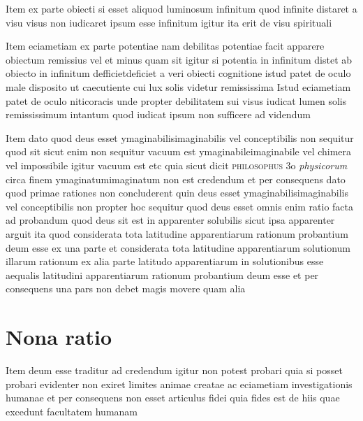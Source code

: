 \documentclass[twoside, openright]{report}
\newcommand{\name}[1]{\textsc{#1}}
\newcommand{\worktitle}[1]{\textit{#1}}
\begin{document}
        \pstart
        Item ex parte obiecti si esset aliquod luminosum infinitum quod infinite distaret a visu visus non iudicaret ipsum esse infinitum igitur ita erit de visu spirituali
        \pend
     
        \pstart
        Item eciametiam ex parte potentiae nam debilitas potentiae facit apparere obiectum remissius vel et minus quam sit igitur si potentia in infinitum distet ab obiecto in infinitum defficietdeficiet a veri obiecti cognitione istud patet de oculo male disposito ut caecutiente cui lux solis videtur remississima Istud eciametiam patet de oculo niticoracis unde propter debilitatem sui visus iudicat lumen solis remississimum intantum quod iudicat ipsum non sufficere ad videndum
        \pend
     
        \pstart
        Item dato quod deus esset ymaginabilisimaginabilis vel conceptibilis non sequitur quod sit sicut enim non sequitur vacuum est ymaginabileimaginabile vel chimera vel impossibile igitur vacuum est etc quia sicut dicit \name{philosophus} 3o \worktitle{physicorum}\index[works]{} circa finem ymaginatumimaginatum non est credendum et per consequens dato quod primae rationes non concluderent quin deus esset ymaginabilisimaginabilis vel conceptibilis non propter hoc sequitur quod deus esset omnis enim ratio facta ad probandum quod deus sit est in apparenter solubilis sicut ipsa apparenter arguit ita quod considerata tota latitudine apparentiarum rationum probantium deum esse ex una parte et considerata tota latitudine apparentiarum solutionum illarum rationum ex alia parte latitudo apparentiarum in solutionibus esse aequalis latitudini apparentiarum rationum probantium deum esse et per consequens una pars non debet magis movere quam alia
        \pend
      
        \bigskip
         \section*{Nona ratio} 
        \pstart
        Item deum esse traditur ad credendum igitur non potest probari quia si posset probari evidenter non exiret limites animae creatae ac eciametiam investigationis humanae et per consequens non esset articulus fidei quia fides est de hiis quae excedunt facultatem humanam
        \pend
      
        \bigskip
         
\end{document}
